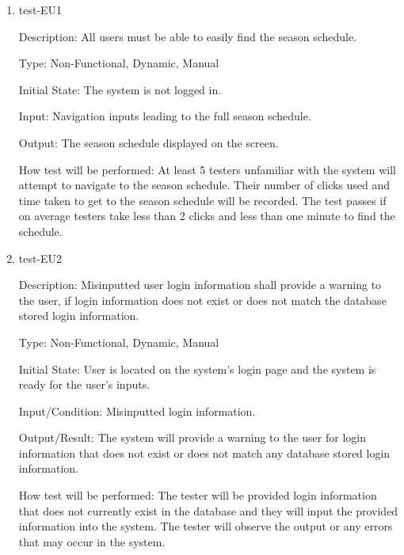 \documentclass[12pt, titlepage]{article}
\begin{document}
\begin{enumerate}

  \item{test-EU1\\}
  
  Description: All users must be able to easily find the season
  schedule.

  Type: Non-Functional, Dynamic, Manual

  Initial State: The system is not logged in.

  Input: Navigation inputs leading to the full season schedule.

  Output: The season schedule displayed on the screen.

  How test will be performed: At least 5 testers unfamiliar with the system will
  attempt to navigate to the season schedule. Their number of clicks used and
  time taken to get to the season schedule will be recorded. The test passes
  if on average testers take less than 2 clicks and less than one minute to
  find the schedule.

  \item{test-EU2\\}
  
  Description: Misinputted user login information shall provide
  a warning to the user, if login information does not exist
  or does not match the database stored login information.

  Type: Non-Functional, Dynamic, Manual

  Initial State: User is located on the system's login page and the system is ready
  for the user's inputs.

  Input/Condition: Misinputted login information.

  Output/Result: The system will provide a warning to the user for login information that
  does not exist or does not match any database stored login information.

  How test will be performed: The tester will be provided login information that does not
  currently exist in the database and they will input the provided information into the
  system. The tester will observe the output or any errors that may occur in the system.

  
            
            

\end{enumerate}
\end{document}

